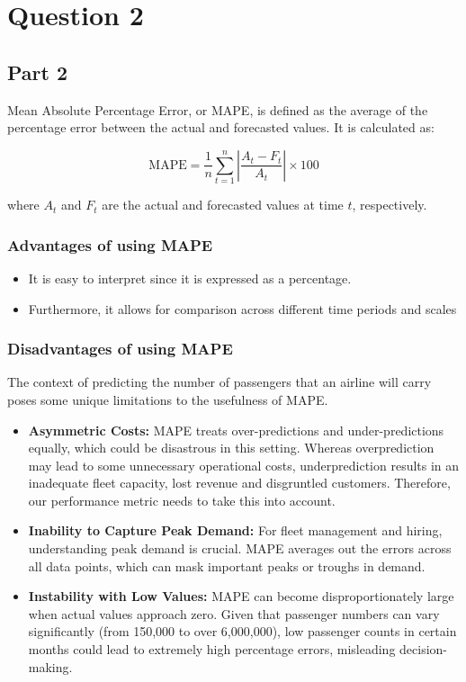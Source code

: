 \documentclass{article}
\author{}
\date{}
\begin{document}
\newpage
\section{Question 2}

\subsection{Part 2}

Mean Absolute Percentage Error, or MAPE, is defined as the average of the percentage error between the actual and forecasted values. It is calculated as:

\[
\text{MAPE} = \frac{1}{n} \sum_{t=1}^{n} \left| \frac{A_t - F_t}{A_t} \right| \times 100
\]

where $A_t$ and $F_t$ are the actual and forecasted values at time $t$, respectively.

\subsubsection{Advantages of using MAPE}

\begin{itemize}
    \item It is easy to interpret since it is expressed as a    percentage.
    
    \item Furthermore, it allows for comparison across different time periods and scales
\end{itemize}

\subsubsection{Disadvantages of using MAPE}

The context of predicting the number of passengers that an
airline will carry poses some unique limitations to the usefulness of MAPE.

\begin{itemize}
    \item \textbf{Asymmetric Costs:} MAPE treats over-predictions and  under-predictions equally, which could be disastrous in this setting. Whereas overprediction may lead to some unnecessary operational costs, underprediction results in an inadequate fleet capacity, lost revenue and disgruntled customers. Therefore, our performance metric needs to take this into account.
    
    \item \textbf{Inability to Capture Peak Demand:} For fleet management and hiring, understanding peak demand is crucial. MAPE averages out the errors across all data points, which can mask important peaks or troughs in demand.
    
    \item \textbf{Instability with Low Values:} MAPE can become disproportionately large when actual values approach zero. Given that passenger numbers can vary significantly (from 150,000 to over 6,000,000), low passenger counts in certain months could lead to extremely high percentage errors, misleading decision-making.
\end{itemize}
\end{document}
